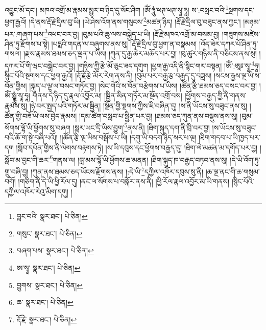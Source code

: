 འབྱུང་མོ་དང་། མཁའ་འགྲོ་མ་རྣམས་མྱུར་བ་ཉིད་དུ་སོང་ཤིག །ཨོཾ་ཧཱུཾ་ཕཊ་ཕཊ་སྭཱ་ཧཱ། ས་:བསླང་བའི་\footnote{བླང་བའི་  སྣར་ཐང་།  པེ་ཅིན། }སྔགས་དང་ཕྱག་རྒྱའོ། །དེ་ནས་རྡོ་རྗེ་དྲིལ་བུ་ཡི། །ཡེ་ཤེས་འོག་ནས་གསུངས་\footnote{གསུང་  སྣར་ཐང་།  པེ་ཅིན། }མཚན་ཉིད། །རྡོ་རྗེ་དྲིལ་བུ་བཟུང་ནས་ཀྱང་། །མཉམ་པར་:གཞག་པས་\footnote{བཞག་པས་  སྣར་ཐང་།  པེ་ཅིན། }འཕང་བར་བྱ། །བུམ་པའི་ཆུ་ལས་བསྐྱེད་པ་ཡི། །རྡོ་རྗེ་མཁའ་འགྲོ་མ་བསམ་བྱ། །གཟུགས་མཛེས་ཤིན་ཏུ་རྫོགས་པ་སྟེ། །པདྨའི་གདན་ལ་བཞུགས་ནས་སུ། །རྡོ་རྗེ་དྲིལ་བུ་ཕྱག་ན་བསྣམས། །འོད་ཟེར་དཀར་པོ་ཤིན་ཏུ་གསལ། །རྫས་རྣམས་ཐམས་ཅད་ལྡན་པ་ཡིས། །ཀུན་དུ་རྒྱ་ཆེར་མཆོད་པར་བྱ། །ཁུ་ཚུར་གཉིས་ནི་བཅིངས་ནས་སུ། །དཀར་པོ་གི་ཝང་བསྒྲེང་བར་བྱ། །གཉིས་ཀྱི་རྩེ་མོ་ཅུང་ཟད་དགུག །ཕྱག་རྒྱ་འདི་ནི་སྙིང་གར་བསྟན། །ཨོཾ་:ཨཱཿ་སྭཱ་\footnote{ཨ་སྭཱ་  སྣར་ཐང་།  པེ་ཅིན། }ཧཱ། སྙིང་པོའི་སྔགས་དང་ཕྱག་རྒྱའོ། །རྡོ་རྗེ་རྩེ་མོར་རེག་ནས་ནི། །བུམ་པར་བརྒྱ་རྩ་བརྒྱད་དུ་བཟླས། །སངས་རྒྱས་ལྔ་ཡི་ས་བོན་གྱིས། །སྐུད་པ་ལྔ་ལ་བསང་གཏོར་བྱ། །སེང་གེའི་ས་བོན་བརྩེགས་པ་ཡིས། །ཚོན་རྩི་ཐམས་ཅད་བསང་བར་བྱ། །ཨོཾ་སྨྼྻུཾ་སྭཱ་ཧཱ། གནས་དེ་ཉིད་དུ་རྣལ་འབྱོར་མ། །སྦྱིན་མིན་གཏོར་མ་སྔོན་འགྲོ་བས། །ཕྱོགས་བརྒྱད་ཀྱི་ནི་གནས་རྣམས་སུ། །ཉེ་བར་སྤྱད་པའི་གཏོར་མ་སྦྱིན། །སྔོན་གྱི་སྔགས་ཀྱིས་ཇི་བཞིན་དུ། །ས་ནི་ཡོངས་སུ་བཟུང་ནས་སུ། །ཚོན་གྱི་བཟོ་ཡི་ལས་བྱེད་རྣམས། །དམ་ཚིག་བསླབ་པ་སྦྱིན་པར་བྱ། །ཐམས་ཅད་ཀུན་ནས་བསྡུས་ནས་སུ། །བུམ་སོགས་ལྷོ་ཡི་ཕྱོགས་སུ་བཞག །སླར་ཡང་དྲི་ཡིས་བྱུག་\footnote{བྱུགས་  སྣར་ཐང་།  པེ་ཅིན། }ནས་ནི། །ཐིག་སྐུད་དག་ནི་བྲི་བར་བྱ། །ས་ཡོངས་སུ་བཟུང་བའི་ཆོ་ག་སྟེ་བཞི་པའོ།། །།ཚོན་རྩི་ལྔ་ཡིས་བསྒོས་པ་ཡི། །དགུ་ཡི་བདག་ཉིད་སར་པ་ལྔ། །ཐིག་གདབ་པ་ཡི་ཁྱད་པར་དག །སློབ་དཔོན་གྱིས་ནི་ལེགས་བརྟགས་ཏེ། །ས་ཡི་དབུས་དང་ཕྱོགས་བརྒྱད་དུ། །ཐིག་ལེ་མཚན་མ་དགོད་པར་བྱ། །སློབ་མ་བྱང་གི་ཆར་\footnote{ཆ་  སྣར་ཐང་།  པེ་ཅིན། }གནས་ལ། །བླ་མས་ལྷོ་ཡི་ཕྱོགས་ཆ་མནན། །ཐིག་སྐུད་ཁ་བརྒྱད་བཏབ་ནས་སུ། །དེ་ཡི་འོག་ཏུ་གྲུ་བཞི་བྱ། །ཀུན་ནས་ཐམས་ཅད་ཡོངས་རྫོགས་ནས། །:དེ་ཡི་\footnote{རྡོ་རྗེ་  སྣར་ཐང་།  པེ་ཅིན། }དཀྱིལ་འཁོར་དབུས་སུ་ནི། །ཆ་ལྔ་ནང་གི་ཆ་གསུམ་བགོ། །གཅིག་ནི་དེ་ཡི་ཕྱི་རོལ་དུ། །ནང་ལ་སོགས་པ་བསྐོར་ནས་ནི། །ཕྱི་རོལ་རྣལ་འབྱོར་མ་ཡི་གནས། །སྙིང་པོའི་དཀྱིལ་འཁོར་རེའུ་མིག་དགུ། །
